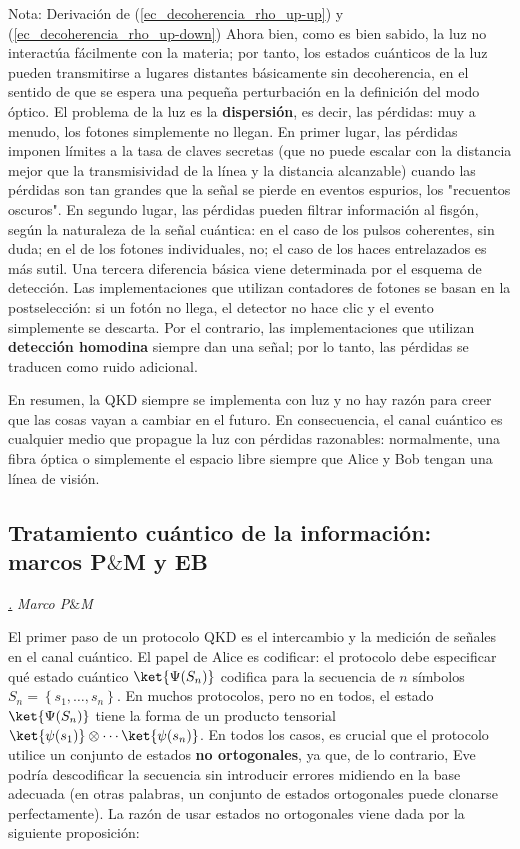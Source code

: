 \documentclass[a4paper,11pt]{book} %
\numberwithin{equation}{chapter}
\def\lch{\left\{}
\def\rch{\right\}}
\def\subsubiContadorIt{\par\addtocounter{subsubsection}{1}\underline{\it\thesubsubsection.}\hskip0.5cm \setcounter{subsubsubsectionIt}{0}}
\newcommand{\SubsubiIt}[1]{
		\subsubiContadorIt \textit{#1}
	}
\newcounter{subsubsubsectionIt}[subsubsection]
\begin{document}
\begin{mybox_blue}{Nota: Derivación de (\ref{ec_decoherencia_rho_up-up}) y  (\ref{ec_decoherencia_rho_up-down})}
Ahora bien, como es bien sabido, la luz no interactúa fácilmente con la materia; por tanto, los estados cuánticos de la luz pueden transmitirse a lugares distantes básicamente sin decoherencia, en el sentido de que se espera una pequeña perturbación en la definición del modo óptico. El problema de la luz es la \textbf{dispersión}, es decir, las pérdidas: muy a menudo, los fotones simplemente no llegan. En primer lugar, las pérdidas imponen límites a la tasa de claves secretas (que no puede escalar con la distancia mejor que la transmisividad de la línea y la distancia alcanzable) cuando las pérdidas son tan grandes que la señal se pierde en eventos espurios, los "recuentos oscuros". En segundo lugar, las pérdidas pueden filtrar información al fisgón, según la naturaleza de la señal cuántica: en el caso de los pulsos coherentes, sin duda; en el de los fotones individuales, no; el caso de los haces entrelazados es más sutil. Una tercera diferencia básica viene determinada por el esquema de detección. Las implementaciones que utilizan contadores de fotones se basan en la postselección: si un fotón no llega, el detector no hace clic y el evento simplemente se descarta. Por el contrario, las implementaciones que utilizan \textbf{detección homodina} siempre dan una señal; por lo tanto, las pérdidas se traducen como ruido adicional.

En resumen, la QKD siempre se implementa con luz y no hay razón para creer que las cosas vayan a cambiar en el futuro. En consecuencia, el canal cuántico es cualquier medio que propague la luz con pérdidas razonables: normalmente, una fibra óptica o simplemente el espacio libre siempre que Alice y Bob tengan una línea de visión.
		
		\subsection{Tratamiento cuántico de la información: marcos P$\&$M y EB}
		
			\SubsubiIt{Marco P$\&$M}
			
El primer paso de un protocolo QKD es el intercambio y la medición de señales en el canal cuántico. El papel de Alice es codificar: el protocolo debe especificar qué estado cuántico $\ket{\Psi(S_n)}$ codifica para la secuencia de $n$ símbolos $S_n = \lch s_1, \dots, s_n \rch$. En muchos protocolos, pero no en todos, el estado $\ket{\Psi(S_n)}$ tiene la forma de un producto tensorial $\ket{\psi(s_1)} \otimes \cdots \ket{\psi(s_n)}$.  En todos los casos, es crucial que el protocolo utilice un conjunto de estados \textbf{no ortogonales}, ya que, de lo contrario, Eve podría descodificar la secuencia sin introducir errores midiendo en la base adecuada (en otras palabras, un conjunto de estados ortogonales puede clonarse perfectamente). La razón de usar estados no ortogonales viene dada por la siguiente proposición:


\end{mybox_blue}
\end{document}
